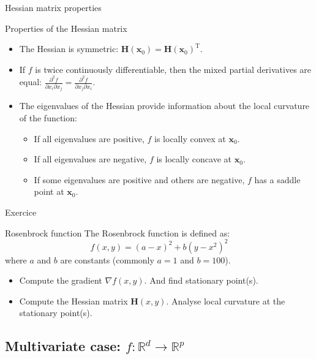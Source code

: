 \documentclass[aspectratio=1610]{beamer}
\begin{document}
\begin{frame}{Hessian matrix properties}

  \begin{block}{Properties of the Hessian matrix}
    \begin{itemize}
      \item The Hessian is symmetric: $\mathbf{H}(\mathbf{x}_0) = \mathbf{H}(\mathbf{x}_0)^\mathrm{T}$.
      \item If $f$ is twice continuously differentiable, then the mixed partial derivatives are equal: $\frac{\partial^2 f}{\partial x_i \partial x_j} = \frac{\partial^2 f}{\partial x_j \partial x_i}$.
      \item The eigenvalues of the Hessian provide information about the local curvature of the function:
        \begin{itemize}
          \item If all eigenvalues are positive, $f$ is locally convex at $\mathbf{x}_0$.
          \item If all eigenvalues are negative, $f$ is locally concave at $\mathbf{x}_0$.
          \item If some eigenvalues are positive and others are negative, $f$ has a saddle point at $\mathbf{x}_0$.
        \end{itemize}
    \end{itemize}
  \end{block}
\end{frame}


\begin{frame}{Exercice}

  \begin{block}{Rosenbrock function}
    The Rosenbrock function is defined as:
    $$f(x,y) = (a - x)^2 + b(y - x^2)^2$$
    where $a$ and $b$ are constants (commonly $a=1$ and $b=100$).

    \begin{itemize}
      \item Compute the gradient $\nabla f(x,y)$. And find stationary point(s).
      \item Compute the Hessian matrix $\mathbf{H}(x,y)$. Analyse local curvature at the stationary point(s).
    \end{itemize}
  \end{block}
  
\end{frame}
  

\subsection{Multivariate case: $f:\mathbb{R}^d \to \mathbb{R}^p$}
\end{document}
